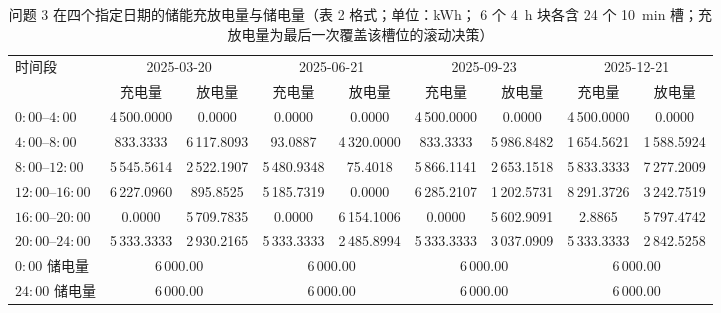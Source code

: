 \begin{table}[htbp]
  \centering
  \caption{问题 3 在四个指定日期的储能充放电量与储电量（表 2 格式；单位：kWh；
           6 个 4~h 块各含 24 个 10~min 槽；充放电量为最后一次覆盖该槽位的滚动决策）}
  \label{tab:q3-t2}
  \footnotesize
  \setlength{\tabcolsep}{4pt}
  \begin{tabular}{l*{4}{cc}}
    \toprule
    \multirow{2}{*}{时间段} & \multicolumn{2}{c}{2025-03-20} & \multicolumn{2}{c}{2025-06-21}
                            & \multicolumn{2}{c}{2025-09-23} & \multicolumn{2}{c}{2025-12-21} \\
    \cmidrule(lr){2-3}\cmidrule(lr){4-5}\cmidrule(lr){6-7}\cmidrule(lr){8-9}
     & 充电量 & 放电量 & 充电量 & 放电量 & 充电量 & 放电量 & 充电量 & 放电量 \\
    \midrule
    \(0{:}00\)--\(4{:}00\)   & 4\,500.0000 & 0.0000 & 0.0000 & 0.0000 & 4\,500.0000 & 0.0000 & 4\,500.0000 & 0.0000 \\
    \(4{:}00\)--\(8{:}00\)   & 833.3333 & 6\,117.8093 & 93.0887 & 4\,320.0000 & 833.3333 & 5\,986.8482 & 1\,654.5621 & 1\,588.5924 \\
    \(8{:}00\)--\(12{:}00\)  & 5\,545.5614 & 2\,522.1907 & 5\,480.9348 & 75.4018 & 5\,866.1141 & 2\,653.1518 & 5\,833.3333 & 7\,277.2009 \\
    \(12{:}00\)--\(16{:}00\) & 6\,227.0960 & 895.8525 & 5\,185.7319 & 0.0000 & 6\,285.2107 & 1\,202.5731 & 8\,291.3726 & 3\,242.7519 \\
    \(16{:}00\)--\(20{:}00\) & 0.0000 & 5\,709.7835 & 0.0000 & 6\,154.1006 & 0.0000 & 5\,602.9091 & 2.8865 & 5\,797.4742 \\
    \(20{:}00\)--\(24{:}00\) & 5\,333.3333 & 2\,930.2165 & 5\,333.3333 & 2\,485.8994 & 5\,333.3333 & 3\,037.0909 & 5\,333.3333 & 2\,842.5258 \\
    \midrule
    \(0{:}00\) 储电量 & \multicolumn{2}{c}{6\,000.00} & \multicolumn{2}{c}{6\,000.00}
                      & \multicolumn{2}{c}{6\,000.00} & \multicolumn{2}{c}{6\,000.00} \\
    \(24{:}00\) 储电量 & \multicolumn{2}{c}{6\,000.00} & \multicolumn{2}{c}{6\,000.00}
                       & \multicolumn{2}{c}{6\,000.00} & \multicolumn{2}{c}{6\,000.00} \\
    \bottomrule
  \end{tabular}
\end{table}



